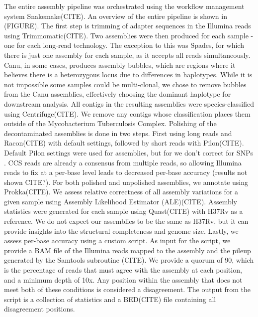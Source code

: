The entire assembly pipeline was orchestrated using the workflow management system Snakemake(CITE). An overview of the entire pipeline is shown in (FIGURE). The first step is trimming of adapter sequences in the Illumina reads using Trimmomatic(CITE). Two assemblies were then produced for each sample - one for each long-read technology. The exception to this was Spades, for which there is just one assembly for each sample, as it accepts all reads simultaneously. Canu, in some cases, produces assembly bubbles, which are regions where it believes there is a heterozygous locus due to differences in haplotypes. While it is not impossible some samples could be multi-clonal, we chose to remove bubbles from the Canu assemblies, effectively choosing the dominant haplotype for downstream analysis.  
All contigs in the resulting assemblies were species-classified using Centrifuge(CITE). We remove any contigs whose classification places them outside of the Mycobacterium Tuberculosis Complex.  
Polishing of the decontaminated assemblies is done in two steps. First using long reads and Racon(CITE) with default settings, followed by short reads with Pilon(CITE). Default Pilon settings were used for \ont{} assemblies, but for \pb{} we don't correct for SNPs . \pb{} CCS reads are already a consensus from multiple reads, so allowing Illumina reads to fix at a per-base level leads to decreased per-base accuracy (results not shown CITE?).  
For both polished and unpolished assemblies, we annotate using Prokka(CITE). We assess relative correctness of all assembly variations for a given sample using Assembly Likelihood Estimator (ALE)(CITE). Assembly statistics were generated for each sample using Quast(CITE) with H37Rv as a reference. We do not expect our assemblies to be the same as H37Rv, but it can provide insights into the structural completeness and genome size. Lastly, we assess per-base accuracy using a custom script. As input for the script, we provide a BAM file of the Illumina reads mapped to the assembly and the pileup generated by the Samtools subroutine (CITE). We provide a quorum of 90, which is the percentage of reads that must agree with the assembly at each position, and a minimum depth of 10x. Any position within the assembly that does not meet both of these conditions is considered a disagreement. The output from the script is a collection of statistics and a BED(CITE) file containing all disagreement positions.

